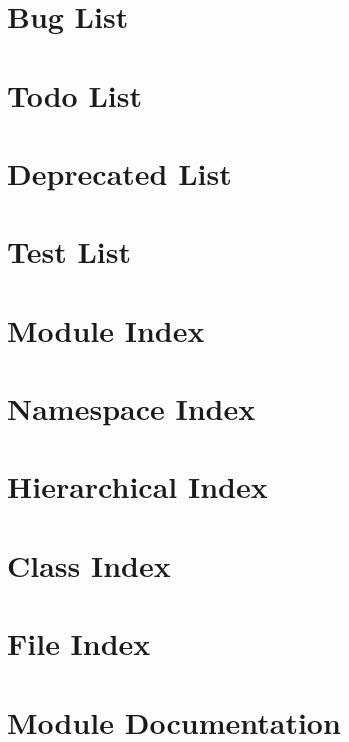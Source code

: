 \documentclass[twoside]{book}
\newcommand{\+}{\discretionary{\mbox{\scriptsize$\hookleftarrow$}}{}{}}
\begin{document}
\chapter{Bug List}
\label{bug}

\chapter{Todo List}
\label{todo}

\chapter{Deprecated List}
\label{deprecated}

\chapter{Test List}
\label{test}

\chapter{Module Index}

\chapter{Namespace Index}

\chapter{Hierarchical Index}

\chapter{Class Index}

\chapter{File Index}

\chapter{Module Documentation}















\end{document}
